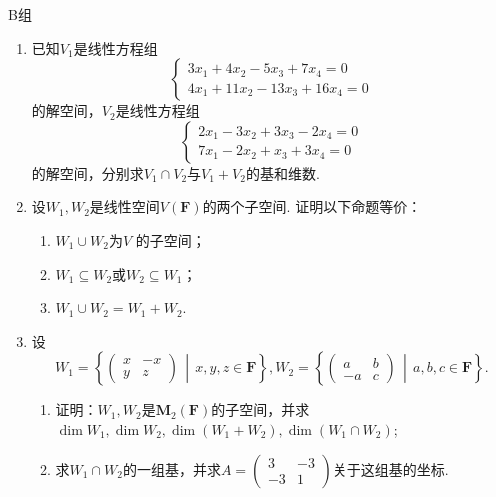 \centerline{\heiti B组}
\begin{enumerate}
    \item 已知$V_1$是线性方程组\[\begin{cases}
                  3x_1+4x_2-5x_3+7x_4=0 \\
                  4x_1+11x_2-13x_3+16x_4=0
              \end{cases}\]
          的解空间，$V_2$是线性方程组\[\begin{cases}
                  2x_1-3x_2+3x_3-2x_4=0 \\
                  7x_1-2x_2+x_3+3x_4=0
              \end{cases}\]
          的解空间，分别求$V_1 \cap V_2$与$V_1+V_2$的基和维数.

    \item 设$W_1,W_2$是线性空间$V(\mathbf{F})$的两个子空间. 证明以下命题等价：
          \begin{enumerate}
              \item $W_1 \cup W_2$为$V$ 的子空间；

              \item $W_1 \subseteq W_2$或$W_2 \subseteq W_1$；

              \item $W_1 \cup W_2=W_1+W_2$.
          \end{enumerate}

    \item 设\[W_1=\left\{\begin{pmatrix}
                  x & -x \\ y & z
              \end{pmatrix} \,\middle|\, x,y,z\in \mathbf{F} \right\},W_2=\left\{\begin{pmatrix}
                  a & b \\ -a & c
              \end{pmatrix} \,\middle|\, a,b,c\in \mathbf{F} \right\}.\]

          \begin{enumerate}
              \item 证明：$W_1,W_2$是$\mathbf{M}_2(\mathbf{F})$的子空间，并求$\dim W_1,\dim W_2,\dim(W_1+W_2),\dim(W_1\cap W_2)$;

              \item 求$W_1\cap W_2$的一组基，并求$A=\begin{pmatrix}
                            3 & -3 \\ -3 & 1
                        \end{pmatrix}$关于这组基的坐标.
          \end{enumerate}


\end{enumerate}
